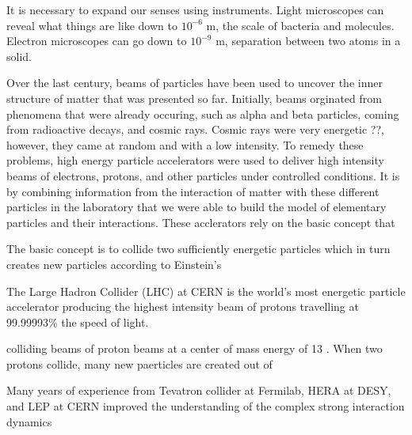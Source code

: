 It is necessary to expand our senses using instruments.
Light microscopes can reveal what things are like down to 
$10^{-6}$ m, the scale of 
bacteria and molecules. 
Electron microscopes can go down to $10^{-9}$ m, separation between two 
atoms in a solid. 


Over the last century, beams of particles have been used to uncover the inner
structure of matter that was presented so far. 
Initially, beams orginated from phenomena that were 
already occuring, such as alpha and beta particles, coming from radioactive 
decays, and cosmic rays.
Cosmic rays were very energetic ??, however, they came at random and 
with a low intensity. To remedy these problems, 
high energy particle accelerators were used to deliver high intensity beams of 
electrons, protons, and other particles under controlled conditions.
It is by combining information from the interaction of matter with these 
different particles in the laboratory that we were able to build the model of 
elementary particles and their interactions.
These acclerators rely on the basic concept that 

The basic concept is to collide two sufficiently energetic particles 
which in turn creates new particles according to Einstein's 

The Large Hadron Collider (LHC) at CERN is the world's most energetic 
particle accelerator producing the highest intensity beam of protons 
travelling at 99.99993\% the speed of light. 

colliding beams of proton beams at a center of mass 
energy of 13 \TeV. When two protons collide, many new paerticles are 
created out of 


Many years of experience from Tevatron collider at Fermilab\cite{tevatron}, 
HERA at DESY\cite{hera}, and LEP\cite{lep} at CERN improved the understanding of the 
complex strong interaction dynamics 


